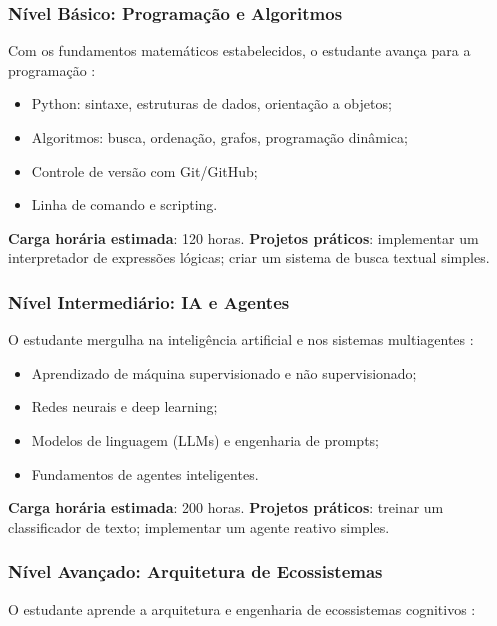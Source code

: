 \subsubsection{Nível Básico: Programação e Algoritmos}

Com os fundamentos matemáticos estabelecidos, o estudante avança para a
programação \cite{cormen2009algorithms}:

\begin{itemize}
\item Python: sintaxe, estruturas de dados, orientação a objetos;
\item Algoritmos: busca, ordenação, grafos, programação dinâmica;
\item Controle de versão com Git/GitHub;
\item Linha de comando e scripting.
\end{itemize}

\textbf{Carga horária estimada}: 120 horas.
\textbf{Projetos práticos}: implementar um interpretador de expressões
lógicas; criar um sistema de busca textual simples.

\subsubsection{Nível Intermediário: IA e Agentes}

O estudante mergulha na inteligência artificial e nos sistemas multiagentes
\cite{russell2020inteligencia, wooldridge2009multiagent}:

\begin{itemize}
\item Aprendizado de máquina supervisionado e não supervisionado;
\item Redes neurais e deep learning;
\item Modelos de linguagem (LLMs) e engenharia de prompts;
\item Fundamentos de agentes inteligentes.
\end{itemize}

\textbf{Carga horária estimada}: 200 horas.
\textbf{Projetos práticos}: treinar um classificador de texto; implementar
um agente reativo simples.

\subsubsection{Nível Avançado: Arquitetura de Ecossistemas}

O estudante aprende a arquitetura e engenharia de ecossistemas cognitivos
\cite{opencode2026ecosystem}:

